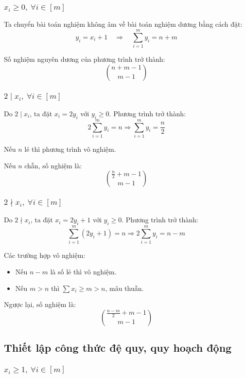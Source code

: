 \documentclass{article}
\begin{document}
	\subsubsection*{$x_i \ge 0,\ \forall i \in [m]$}
	
	Ta chuyển bài toán nghiệm không âm về bài toán nghiệm dương bằng cách đặt:
	\[
	y_i = x_i + 1 \quad \Rightarrow \quad \sum_{i=1}^m y_i = n + m
	\]
	
	Số nghiệm nguyên dương của phương trình trở thành:
	\[
	\binom{n+m-1}{m-1}
	\]
	
	\subsubsection*{$2 \mid x_i,\ \forall i \in [m]$}
	
	Do $2 \mid x_i$, ta đặt $x_i = 2y_i$ với $y_i \ge 0$. Phương trình trở thành:
	\[
	2\sum_{i=1}^m y_i = n \Rightarrow \sum_{i=1}^m y_i = \frac{n}{2}
	\]
	
	Nếu $n$ lẻ thì phương trình vô nghiệm.
	
	Nếu $n$ chẵn, số nghiệm là:
	\[
	\binom{\frac{n}{2} + m - 1}{m - 1}
	\]
	
	\subsubsection*{$2 \nmid x_i,\ \forall i \in [m]$}
	
	Do $2 \nmid x_i$, ta đặt $x_i = 2y_i + 1$ với $y_i \ge 0$. Phương trình trở thành:
	\[
	\sum_{i=1}^m (2y_i + 1) = n \Rightarrow 2\sum_{i=1}^m y_i = n - m
	\]
	
	Các trường hợp vô nghiệm:
	\begin{itemize}
		\item Nếu $n - m$ là số lẻ thì vô nghiệm.
		\item Nếu $m > n$ thì $\sum x_i \ge m > n$, mâu thuẫn.
	\end{itemize}
	
	Ngược lại, số nghiệm là:
	\[
	\binom{\frac{n - m}{2} + m - 1}{m - 1}
	\]
	
	\subsection*{Thiết lập công thức đệ quy, quy hoạch động}
	
	\subsubsection*{$x_i \ge 1,\ \forall i \in [m]$}
	
\end{document}
